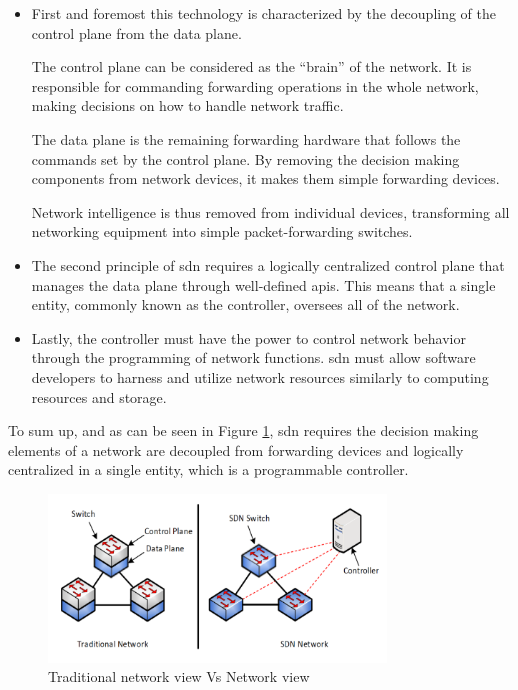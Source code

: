 \begin{itemize}

	\item First and foremost this technology is characterized by the decoupling of the control plane from the data plane. 

    The control plane can be considered as the “brain” of the network. It is responsible for commanding forwarding operations in the whole network, making decisions on how to handle network traffic.  

    The data plane is the remaining forwarding hardware that follows the commands set by the control plane. By removing the decision making components from network devices, it makes them simple forwarding devices.

    Network intelligence is thus removed from individual devices, transforming all networking equipment into simple packet-forwarding switches.

	\item The second principle of \gls{sdn} requires a logically centralized control plane that manages the data plane through well-defined \glspl{api}. This means that a single entity, commonly known as the controller, oversees all of the network. 

	\item Lastly, the controller must have the power to control network behavior through the programming of network functions. \gls{sdn} must allow software developers to harness and utilize network resources similarly to computing resources and storage. 

\end{itemize}

To sum up, and as can be seen in Figure \ref{fig:sdn_vs_legacy}, \gls{sdn} requires the decision making elements of a network are decoupled from forwarding devices and logically centralized in a single entity, which is a programmable controller. 

\begin{figure}
	\centering
	\includegraphics[width=0.8\textwidth]{Chapters/Figures/SDNs/sdn_vs_legacy.png}
	\caption{Traditional network view Vs  Network view~\cite{alowa_scalable_2020}}
	\label{fig:sdn_vs_legacy}
\end{figure}

